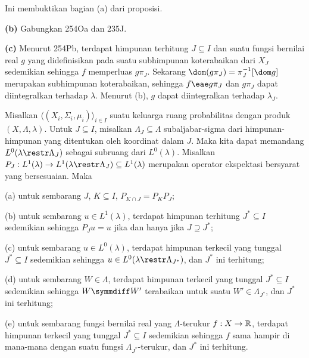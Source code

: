 {Ini membuktikan bagian (a) dari proposisi.

\medskip

{\bf (b)} Gabungkan 254Oa dan 235J.

\medskip

{\bf (c)} Menurut 254Pb, terdapat himpunan terhitung $J\subseteq I$ dan suatu
fungsi bernilai real $g$ yang didefinisikan pada suatu subhimpunan koterabaikan dari $X_J$ sedemikian
sehingga $f$ memperluas $g\pi_J$.   Sekarang $\dom(g\pi_J)=\pi_J^{-1}[\dom g]$
merupakan subhimpunan koterabaikan, sehingga $f\eae g\pi_J$ dan $g\pi_J$ dapat diintegralkan terhadap $\lambda$.
Menurut (b), $g$ dapat diintegralkan terhadap $\lambda_J$.
}%

 Misalkan
$\langle(X_i,\Sigma_i,\mu_i)\rangle_{i\in I}$ suatu keluarga ruang
probabilitas dengan produk
$(X,\Lambda,\lambda)$. Untuk $J\subseteq I$, misalkan
$\Lambda_J\subseteq\Lambda$ subaljabar-sigma dari himpunan-himpunan yang
ditentukan oleh koordinat dalam $J$. Maka kita dapat memandang
$L^0(\lambda\restr\Lambda_J)$ sebagai subruang dari
$L^0(\lambda)$. Misalkan
$P_J:L^1(\lambda)\to L^1(\lambda\restr\Lambda_J)\subseteq L^1(\lambda)$
merupakan operator
ekspektasi bersyarat yang bersesuaian. Maka

(a) untuk sembarang $J$, $K\subseteq I$, $P_{K\cap J}=P_KP_J$;

(b) untuk sembarang $u\in L^1(\lambda)$, terdapat himpunan terhitung
$J^*\subseteq I$ sedemikian sehingga $P_Ju=u$ jika dan hanya jika $J\supseteq J^*$;

(c) untuk sembarang $u\in L^0(\lambda)$, terdapat himpunan terkecil yang tunggal
$J^*\subseteq I$ sedemikian sehingga $u\in L^0(\lambda\restr\Lambda_{J^*})$, dan
$J^*$ ini terhitung;

(d) untuk sembarang $W\in\Lambda$, terdapat himpunan terkecil yang tunggal
$J^*\subseteq I$
sedemikian sehingga $W\symmdiff W'$ terabaikan untuk suatu $W'\in\Lambda_{J^*}$,
dan $J^*$ ini terhitung;

(e) untuk sembarang fungsi bernilai real yang $\Lambda$-terukur $f:X\to\Bbb R$,
terdapat himpunan terkecil yang tunggal $J^*\subseteq I$ sedemikian sehingga $f$ sama
hampir di mana-mana dengan suatu fungsi $\Lambda_{J^*}$-terukur, dan $J^*$ ini
terhitung.

